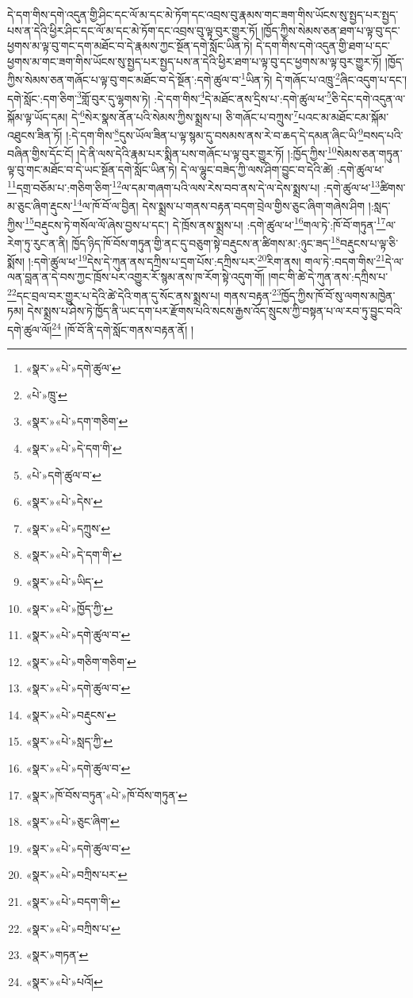 དེ་དག་གིས་དགེ་འདུན་གྱི་ཤིང་དང་ལོ་མ་དང་མེ་ཏོག་དང་འབྲས་བུ་རྣམས་གང་ཟག་གིས་ཡོངས་སུ་སྤྱད་པར་སྤྱད་པས་ན་དེའི་ཕྱིར་ཤིང་དང་ལོ་མ་དང་མེ་ཏོག་དང་འབྲས་བུ་ལྟ་བུར་གྱུར་ཏོ། །ཁྱོད་ཀྱིས་སེམས་ཅན་ཐག་པ་ལྟ་བུ་དང་ཕྱགས་མ་ལྟ་བུ་གང་དག་མཐོང་བ་དེ་རྣམས་ཀྱང་སྔོན་དགེ་སློང་ཡིན་ཏེ། དེ་དག་གིས་དགེ་འདུན་གྱི་ཐག་པ་དང་ཕྱགས་མ་གང་ཟག་གིས་ཡོངས་སུ་སྤྱད་པར་སྤྱད་པས་ན་དེའི་ཕྱིར་ཐག་པ་ལྟ་བུ་དང་ཕྱགས་མ་ལྟ་བུར་གྱུར་ཏོ། །ཁྱོད་ཀྱིས་སེམས་ཅན་གཞོང་པ་ལྟ་བུ་གང་མཐོང་བ་དེ་སྔོན་:དགེ་ཚུལ་བ་\footnote{«སྣར་»«པེ་»དགེ་ཚུལ་}ཡིན་ཏེ། དེ་གཞོང་པ་འཁྲུ་\footnote{«པེ་»ཁྲུ་}ཞིང་འདུག་པ་དང་། དགེ་སློང་:དག་ཅིག་\footnote{«སྣར་»«པེ་»དག་གཅིག་}གློ་བུར་དུ་ལྷགས་ཏེ། :དེ་དག་གིས་\footnote{«སྣར་»«པེ་»དེ་དག་གི་}དེ་མཐོང་ནས་དྲིས་པ་:དགེ་ཚུལ་ཕ་\footnote{«པེ་»དགེ་ཚུལ་བ་}ཅི་དེང་དགེ་འདུན་ལ་སྐོམ་ལྟ་ཡོད་དམ། དེ་\footnote{«སྣར་»«པེ་»དེས་}སེར་སྣས་ནོན་པའི་སེམས་ཀྱིས་སྨྲས་པ། ཅི་གཞོང་པ་བཀྲུས་\footnote{«སྣར་»«པེ་»དཀྲུས་}པའང་མ་མཐོང་ངམ་སྐོམ་འཐུངས་ཟིན་ཏོ། །:དེ་དག་གིས་\footnote{«སྣར་»«པེ་»དེ་དག་གི་}དུས་ཡོལ་ཟིན་པ་ལྟ་སྙམ་དུ་བསམས་ནས་རེ་བ་ཆད་དེ་དམན་ཞིང་ཡི་\footnote{«སྣར་»«པེ་»ཡིད་}བསད་པའི་བཞིན་གྱིས་དོང་ངོ། །དེ་ནི་ལས་དེའི་རྣམ་པར་སྨིན་པས་གཞོང་པ་ལྟ་བུར་གྱུར་ཏོ། །:ཁྱོད་ཀྱིས་\footnote{«སྣར་»«པེ་»ཁྱོད་ཀྱི་}སེམས་ཅན་གཏུན་ལྟ་བུ་གང་མཐོང་བ་དེ་ཡང་སྔོན་དགེ་སློང་ཡིན་ཏེ། དེ་ལ་ལྷུང་བཟེད་ཀྱི་ལས་ཤིག་བྱུང་བ་དེའི་ཚེ། :དགེ་ཚུལ་ཕ་\footnote{«སྣར་»«པེ་»དགེ་ཚུལ་བ་}དགྲ་བཅོམ་པ་:གཅིག་ཅིག་\footnote{«སྣར་»«པེ་»གཅིག་གཅིག་}ལ་དམ་གཞག་པའི་ལས་རེས་བབ་ནས་དེ་ལ་དེས་སྨྲས་པ། :དགེ་ཚུལ་ཕ་\footnote{«སྣར་»«པེ་»དགེ་ཚུལ་བ་}ཚིགས་མ་ཅུང་ཞིག་རྡུངས་\footnote{«སྣར་»«པེ་»བརྡུངས་}ལ་ཁོ་བོ་ལ་བྱིན། དེས་སྨྲས་པ་གནས་བརྟན་བདག་བྲེལ་གྱིས་ཅུང་ཞིག་གཞེས་ཤིག །:སླད་ཀྱིས་\footnote{«སྣར་»«པེ་»སླད་ཀྱི་}བརྡུངས་ཏེ་གསོལ་ལོ་ཞེས་བྱས་པ་དང་། དེ་ཁྲོས་ནས་སྨྲས་པ། :དགེ་ཚུལ་ཕ་\footnote{«སྣར་»«པེ་»དགེ་ཚུལ་བ་}གལ་ཏེ་:ཁོ་བོ་གཏུན་\footnote{«སྣར་»ཁོ་བོས་བཏུན་«པེ་»ཁོ་བོས་གཏུན་}ལ་རེག་ཏུ་རུང་ན་ནི། ཁྱོད་ཉིད་ཁོ་བོས་གཏུན་གྱི་ནང་དུ་བཅུག་སྟེ་བརྡུངས་ན་ཚིགས་མ་:ཉུང་ཟད་\footnote{«སྣར་»«པེ་»ཅུང་ཞིག་}བརྡུངས་པ་ལྟ་ཅི་སྨོས། །:དགེ་ཚུལ་ཕ་\footnote{«སྣར་»«པེ་»དགེ་ཚུལ་བ་}དེས་དེ་ཀུན་ནས་དཀྲིས་པ་དྲག་པོས་:དཀྲིས་པར་\footnote{«སྣར་»«པེ་»བཀྲིས་པར་}རིག་ནས། གལ་ཏེ་:བདག་གིས་\footnote{«སྣར་»«པེ་»བདག་གི་}དེ་ལ་ལན་བླན་ན་དེ་བས་ཀྱང་ཁྲོས་པར་འགྱུར་རོ་སྙམ་ནས་ཁ་རོག་སྟེ་འདུག་གོ། །གང་གི་ཚེ་དེ་ཀུན་ནས་:དཀྲིས་པ་\footnote{«སྣར་»«པེ་»བཀྲིས་པ་}དང་བྲལ་བར་གྱུར་པ་དེའི་ཚེ་དེའི་གན་དུ་སོང་ནས་སྨྲས་པ། གནས་བརྟན་\footnote{«སྣར་»གཏན་}ཁྱོད་ཀྱིས་ཁོ་བོ་སུ་ལགས་མཁྱེན་ཏམ། དེས་སྨྲས་པ་ཤེས་ཏེ་ཁྱོད་ནི་ཡང་དག་པར་རྫོགས་པའི་སངས་རྒྱས་འོད་སྲུངས་ཀྱི་བསྟན་པ་ལ་རབ་ཏུ་བྱུང་བའི་དགེ་ཚུལ་ལོ།\footnote{«སྣར་»«པེ་»པའོ།} །ཁོ་བོ་ནི་དགེ་སློང་གནས་བརྟན་ནོ། །
